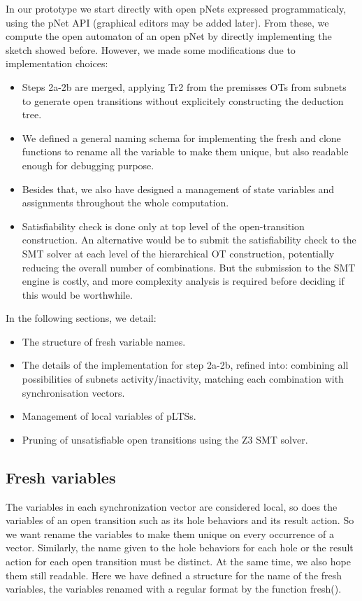 \documentclass{lncs/llncs}
\begin{document}
In our prototype we start directly with open pNets expressed
programmaticaly, using the pNet API (graphical editors may be added
later). From these, we compute
the open automaton of an open pNet by directly
implementing the sketch showed before. However, we made some
modifications due to implementation choices:
\begin{itemize}
  \item Steps 2a-2b are merged, applying Tr2 from the
premisses OTs from subnets to generate open transitions without
explicitely constructing the deduction tree.
  \item We defined a general naming schema for implementing the fresh 
and clone functions to rename all the variable to make them unique, but also
readable enough for debugging purpose.
  \item Besides that, we also have designed a management of state variables and
    assignments throughout the whole computation.
  \item Satisfiability check is done only at
top level of the open-transition construction. An alternative would be
to submit the satisfiability check to the SMT solver at each level of
the hierarchical OT construction, potentially reducing the overall number of
combinations. But the submission to the SMT engine is costly, and more
complexity analysis is required before deciding if this would be
worthwhile. 
\end{itemize}

In the following sections, we detail:
\begin{itemize}
\item The structure of fresh variable names.
\item The details of the implementation for step 2a-2b, refined into:
  \subitem combining all possibilities of subnets activity/inactivity,
  \subitem matching each combination with synchronisation vectors.
\item Management of local variables of pLTSs.
\item Pruning of unsatisfiable open transitions using the Z3 SMT solver.
\end{itemize}

  
  

\subsection{Fresh variables}

The variables in each synchronization vector are considered local, so
does the variables of an open transition such as its hole behaviors
and its result action. So we want rename the variables to make them
unique on every occurrence of a vector. Similarly, the name given to
the hole behaviors for each hole or the result action for each open
transition must be distinct. At the same time, we also hope them still
readable. Here we have defined a structure for the name of the fresh
variables, the variables renamed with a regular format by the function
fresh(). 
\end{document}
